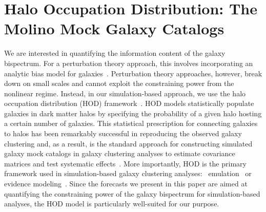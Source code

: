 \section{Halo Occupation Distribution: The Molino Mock Galaxy Catalogs} \label{sec:hod}  
We are interested in quantifying the information content of the galaxy bispectrum. 
For a perturbation theory approach, this involves incorporating an analytic bias model 
for galaxies~\citep[\emph{e.g.}][]{sefusatti2006, yankelevich2019, chudaykin2019}.
Perturbation theory approaches, however, break down on small scales and cannot
exploit the constraining power from the nonlinear regime. Instead, in our simulation-based 
approach, we use the halo occupation distribution (HOD) 
framework~\citep[\emph{e.g.}][]{benson2000, peacock2000, seljak2000,
scoccimarro2001a, berlind2002,
cooray2002, zheng2005, leauthaud2012, tinker2013, zentner2016, vakili2019}.
HOD models statistically populate galaxies in dark matter halos by specifying
the probability of a given halo hosting a certain number of galaxies. This 
statistical prescription for connecting galaxies to halos has been remarkably 
successful in reproducing the observed galaxy clustering and, as a result, is the standard approach for constructing 
simulated galaxy mock catalogs in galaxy clustering analyses to estimate covariance 
matrices and test systematic effects~\citep[\emph{e.g.}][]{rodriguez-torres2016, rodriguez-torres2017, beutler2017}. 
More importantly, HOD is the primary framework used in simulation-based galaxy
clustering analyses: \eg~emulation~\citep{mcclintock2018,
zhai2019} or evidence modeling~\citep{lange2019}. Since the forecasts we
present in this paper are aimed at quantifying the constraining power of the
galaxy bispectrum for simulation-based analyses, the HOD model is particularly 
well-suited for our purpose.

